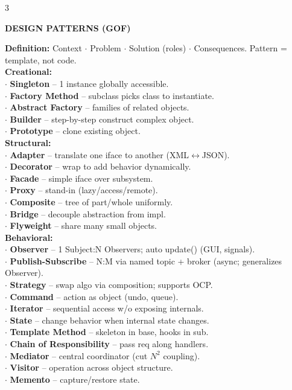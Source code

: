 \documentclass[10pt,letterpaper]{article}
\newenvironment{topic}[1]{%
  \par\addvspace{1.5pt}%
  \noindent\colorbox{hdrBG}{%
    \begin{minipage}{\dimexpr\linewidth-2\fboxsep\relax}%
      \centering\bfseries\sffamily\fontsize{6pt}{7pt}\selectfont\color{hdrFG}\MakeUppercase{#1}%
    \end{minipage}%
  }\par\nobreak\vskip0.5pt%
  \begingroup\setlength{\leftskip}{0pt}\setlength{\rightskip}{0pt}%
}{%
  \endgroup\par\addvspace{0.5pt}%
}
\newcommand{\hd}[1]{\textcolor{accent}{\textbf{#1}}}
\newcommand{\cn}[1]{{\ttfamily\small #1}}
\begin{document}
\begin{multicols*}{3}
\begin{topic}{Design Patterns (GoF)}
\hd{Definition:} Context $\cdot$ Problem $\cdot$ Solution (roles) $\cdot$ Consequences. Pattern = template, not code.\\
\hd{Creational:}\\
$\cdot$ \textbf{Singleton} -- 1 instance globally accessible.\\
$\cdot$ \textbf{Factory Method} -- subclass picks class to instantiate.\\
$\cdot$ \textbf{Abstract Factory} -- families of related objects.\\
$\cdot$ \textbf{Builder} -- step-by-step construct complex object.\\
$\cdot$ \textbf{Prototype} -- clone existing object.\\
\hd{Structural:}\\
$\cdot$ \textbf{Adapter} -- translate one iface to another (XML$\leftrightarrow$JSON).\\
$\cdot$ \textbf{Decorator} -- wrap to add behavior dynamically.\\
$\cdot$ \textbf{Facade} -- simple iface over subsystem.\\
$\cdot$ \textbf{Proxy} -- stand-in (lazy/access/remote).\\
$\cdot$ \textbf{Composite} -- tree of part/whole uniformly.\\
$\cdot$ \textbf{Bridge} -- decouple abstraction from impl.\\
$\cdot$ \textbf{Flyweight} -- share many small objects.\\
\hd{Behavioral:}\\
$\cdot$ \textbf{Observer} -- 1 Subject:N Observers; auto \cn{update()} (GUI, signals).\\
$\cdot$ \textbf{Publish-Subscribe} -- N:M via named topic + broker (async; generalizes Observer).\\
$\cdot$ \textbf{Strategy} -- swap algo via composition; supports OCP.\\
$\cdot$ \textbf{Command} -- action as object (undo, queue).\\
$\cdot$ \textbf{Iterator} -- sequential access w/o exposing internals.\\
$\cdot$ \textbf{State} -- change behavior when internal state changes.\\
$\cdot$ \textbf{Template Method} -- skeleton in base, hooks in sub.\\
$\cdot$ \textbf{Chain of Responsibility} -- pass req along handlers.\\
$\cdot$ \textbf{Mediator} -- central coordinator (cut $N^2$ coupling).\\
$\cdot$ \textbf{Visitor} -- operation across object structure.\\
$\cdot$ \textbf{Memento} -- capture/restore state.
\end{topic}


\end{multicols*}
\end{document}
